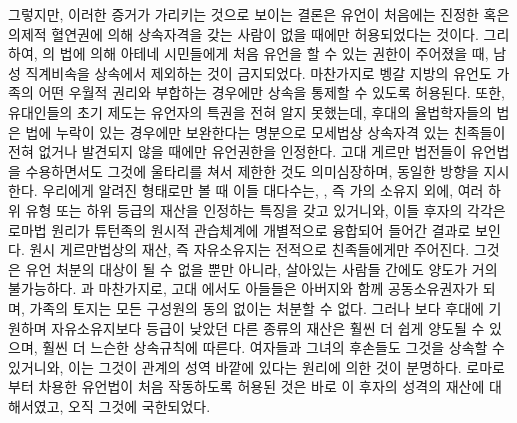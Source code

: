 그렇지만,
이러한 증거가 가리키는 것으로 보이는 결론은
유언이 처음에는
진정한 혹은 의제적 혈연권에 의해
상속자격을 갖는 사람이 없을 때에만 허용되었다는 것이다.
그리하여,
의 법에 의해
아테네 시민들에게 처음
유언을 할 수 있는 권한이 주어졌을 때,
남성 직계비속을 상속에서 제외하는 것이 금지되었다.
마찬가지로 벵갈 지방의 유언도
가족의 어떤 우월적 권리와 부합하는 경우에만
상속을 통제할 수 있도록 허용된다.
또한, 유대인들의 초기 제도는 유언자의 특권을 전혀 알지 못했는데,
후대의 율법학자들의 법은
법에 누락이 있는 경우에만 보완한다는 명분으로
모세법상 상속자격 있는 친족들이 전혀 없거나 발견되지 않을 때에만
유언권한을 인정한다.
고대 게르만 법전들이 유언법을 수용하면서도 그것에 울타리를 쳐서 제한한 것도
의미심장하며, 동일한 방향을 지시한다.
우리에게 알려진 형태로만 볼 때 이들  대다수는,
, 즉 가의 소유지 외에,
여러 하위 유형 또는 하위 등급의 재산을 인정하는
특징을 갖고 있거니와,
이들 후자의 각각은 로마법 원리가 튜턴족의 원시적 관습체계에
개별적으로 융합되어 들어간 결과로 보인다.
원시 게르만법상의 재산, 즉 자유소유지는 전적으로 친족들에게만 주어진다.
그것은 유언 처분의 대상이 될 수 없을 뿐만 아니라,
살아있는 사람들 간에도 양도가 거의 불가능하다.
과 마찬가지로, 고대 에서도
아들들은 아버지와 함께 공동소유권자가 되며,
가족의 토지는 모든 구성원의 동의 없이는 처분할 수 없다.
그러나 보다 후대에 기원하며 자유소유지보다 등급이 낮았던
다른 종류의 재산은 훨씬 더 쉽게 양도될 수 있으며,
훨씬 더 느슨한 상속규칙에 따른다.
여자들과 그녀의 후손들도 그것을 상속할 수 있거니와, 이는
그것이 관계의 성역 바깥에 있다는
원리에 의한 것이 분명하다.
로마로부터 차용한 유언법이 처음 작동하도록 허용된 것은
바로 이 후자의 성격의 재산에 대해서였고, 오직 그것에 국한되었다.

